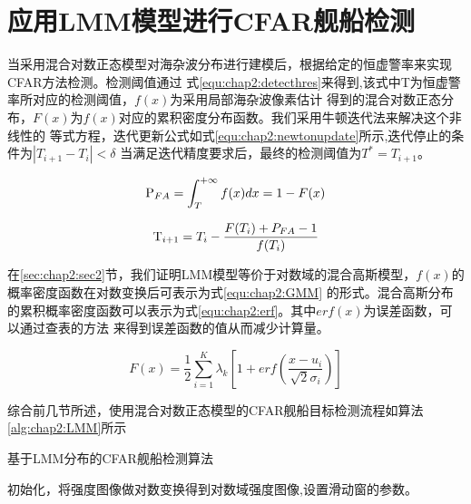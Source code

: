 \section{应用LMM模型进行CFAR舰船检测}
    当采用混合对数正态模型对海杂波分布进行建模后，根据给定的恒虚警率来实现CFAR方法检测。检测阈值通过
    式\ref{equ:chap2:detecthres}来得到,该式中T为恒虚警率所对应的检测阈值，$f(x)$为采用局部海杂波像素估计
    得到的混合对数正态分布，$F(x)$为$f(x)$对应的累积密度分布函数。我们采用牛顿迭代法来解决这个非线性的
    等式方程，迭代更新公式如式\ref{equ:chap2:newtonupdate}所示,迭代停止的条件为$\left| {{T_{i + 1}} - {T_i}} \right| < \delta$
    当满足迭代精度要求后，最终的检测阈值为${T^*} = {T_{i + 1}}$。

    \begin{equation}
      \label{equ:chap2:detecthres}
      {{\rm{P}}_{FA}} = \int_T^{ + \infty } {f(x)dx = 1 - F(x)}
    \end{equation}

    \begin{equation}
      \label{equ:chap2:newtonupdate}
      {{\rm{T}}_{i + 1}} = {T_i} - \frac{{F({T_i}) + {P_{FA}} - 1}}{{f({T_i})}}
    \end{equation}

    在\ref{sec:chap2:sec2}节，我们证明LMM模型等价于对数域的混合高斯模型，$f(x)$的概率密度函数在对数变换后可表示为式\ref{equ:chap2:GMM}
    的形式。混合高斯分布的累积概率密度函数可以表示为式\ref{equ:chap2:erf}。其中$erf(x)$为误差函数，可以通过查表的方法
    来得到误差函数的值从而减少计算量。

    \begin{equation}
      \label{equ:chap2:erf}
      F(x) = \frac{1}{2}\sum\limits_{i = 1}^K {{\lambda _k}[1 + erf(\frac{{x - {u_i}}}{{\sqrt 2 {\sigma _i}}})]}
    \end{equation}

    综合前几节所述，使用混合对数正态模型的CFAR舰船目标检测流程如算法\ref{alg:chap2:LMM}所示

    \begin{algorithm}[t]
      \caption{基于LMM分布的CFAR舰船检测算法}
      \label{alg:chap2:LMM}
      \BlankLine
      初始化，将强度图像做对数变换得到对数域强度图像,设置滑动窗的参数。

    \end{algorithm}

